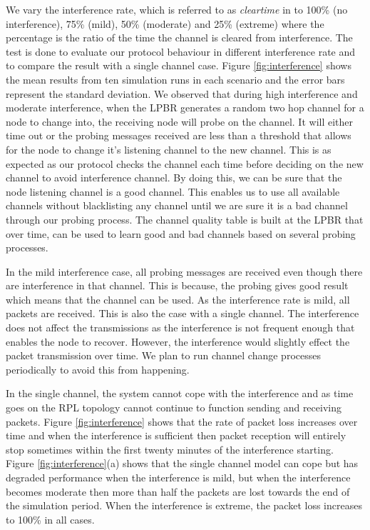 We vary the interference rate, which is referred to as \emph{clear\textunderscore time} in \cite{Boano:2010:MSM:2127940.2127963} to 100\% (no interference), 75\% (mild), 50\% (moderate) and 25\% (extreme) where the percentage is the ratio of the time the channel is cleared from interference. The test is done to evaluate our protocol behaviour in different interference rate and to compare the result with a single channel case. Figure \ref{fig:interference} shows the mean results from ten simulation runs in each scenario and the error bars represent the standard deviation. We observed that during high interference and moderate interference, when the LPBR generates a random two hop channel for a node to change into, the receiving node will probe on the channel. It will either time out or the probing messages received are less than a threshold that allows for the node to change it's listening channel to the new channel. This is as expected as our protocol checks the channel each time before deciding on the new channel to avoid interference channel. By doing this, we can be sure that the node listening channel is a good channel. This enables us to use all available channels without blacklisting any channel until we are sure it is a bad channel through our probing process. The channel quality table is built at the LPBR that over time, can be used to learn good and bad channels based on several probing processes. 

In the mild interference case, all probing messages are received even though there are interference in that channel. This is because, the probing gives good result which means that the channel can be used. As the interference rate is mild, all packets are received. This is also the case with a single channel. The interference does not affect the transmissions as the interference is not frequent enough that enables the node to recover. However, the interference would slightly effect the packet transmission over time. We plan to run channel change processes periodically to avoid this from happening. %

In the single channel,  the system cannot cope with the interference and as time goes on the RPL topology cannot continue to function sending and receiving packets. Figure \ref{fig:interference} shows that the rate of packet loss increases over time and when the interference is sufficient then packet reception will entirely stop sometimes within the first twenty minutes of the interference starting.  Figure \ref{fig:interference}(a) shows that the single channel model can cope but has degraded performance when the interference is mild, but when the interference becomes moderate then more than half the packets are lost towards the end of the simulation period.  When the interference is extreme, the packet loss increases to 100\% 
in all cases.

